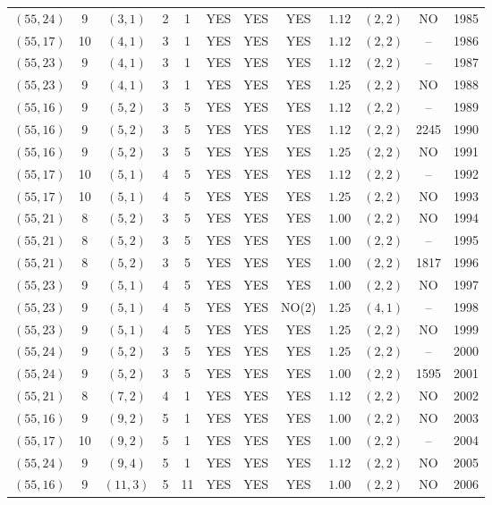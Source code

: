 \begin{longtable}{|c|c|c|c|c|c|c|c|c|c|c|c|}
$(55,24)$ & 9 & $(3,1)$ & 2 & 1 & YES & YES & YES & $1.12$ & $(2,2)$ & NO & 1985\\
$(55,17)$ & 10 & $(4,1)$ & 3 & 1 & YES & YES & YES & $1.12$ & $(2,2)$ & -- & 1986\\
$(55,23)$ & 9 & $(4,1)$ & 3 & 1 & YES & YES & YES & $1.12$ & $(2,2)$ & -- & 1987\\
$(55,23)$ & 9 & $(4,1)$ & 3 & 1 & YES & YES & YES & $1.25$ & $(2,2)$ & NO & 1988\\
$(55,16)$ & 9 & $(5,2)$ & 3 & 5 & YES & YES & YES & $1.12$ & $(2,2)$ & -- & 1989\\
$(55,16)$ & 9 & $(5,2)$ & 3 & 5 & YES & YES & YES & $1.12$ & $(2,2)$ & 2245 & 1990\\
$(55,16)$ & 9 & $(5,2)$ & 3 & 5 & YES & YES & YES & $1.25$ & $(2,2)$ & NO & 1991\\
$(55,17)$ & 10 & $(5,1)$ & 4 & 5 & YES & YES & YES & $1.12$ & $(2,2)$ & -- & 1992\\
$(55,17)$ & 10 & $(5,1)$ & 4 & 5 & YES & YES & YES & $1.25$ & $(2,2)$ & NO & 1993\\
$(55,21)$ & 8 & $(5,2)$ & 3 & 5 & YES & YES & YES & $1.00$ & $(2,2)$ & NO & 1994\\
$(55,21)$ & 8 & $(5,2)$ & 3 & 5 & YES & YES & YES & $1.00$ & $(2,2)$ & -- & 1995\\
$(55,21)$ & 8 & $(5,2)$ & 3 & 5 & YES & YES & YES & $1.00$ & $(2,2)$ & 1817 & 1996\\
$(55,23)$ & 9 & $(5,1)$ & 4 & 5 & YES & YES & YES & $1.00$ & $(2,2)$ & NO & 1997\\
$(55,23)$ & 9 & $(5,1)$ & 4 & 5 & YES & YES & NO(2) & $1.25$ & $(4,1)$ & -- & 1998\\
$(55,23)$ & 9 & $(5,1)$ & 4 & 5 & YES & YES & YES & $1.25$ & $(2,2)$ & NO & 1999\\
$(55,24)$ & 9 & $(5,2)$ & 3 & 5 & YES & YES & YES & $1.25$ & $(2,2)$ & -- & 2000\\
$(55,24)$ & 9 & $(5,2)$ & 3 & 5 & YES & YES & YES & $1.00$ & $(2,2)$ & 1595 & 2001\\
$(55,21)$ & 8 & $(7,2)$ & 4 & 1 & YES & YES & YES & $1.12$ & $(2,2)$ & NO & 2002\\
$(55,16)$ & 9 & $(9,2)$ & 5 & 1 & YES & YES & YES & $1.00$ & $(2,2)$ & NO & 2003\\
$(55,17)$ & 10 & $(9,2)$ & 5 & 1 & YES & YES & YES & $1.00$ & $(2,2)$ & -- & 2004\\
$(55,24)$ & 9 & $(9,4)$ & 5 & 1 & YES & YES & YES & $1.12$ & $(2,2)$ & NO & 2005\\
$(55,16)$ & 9 & $(11,3)$ & 5 & 11 & YES & YES & YES & $1.00$ & $(2,2)$ & NO & 2006\\

\end{longtable}
